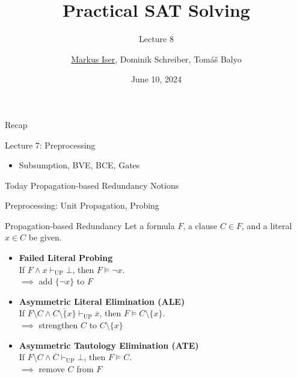 \documentclass[t]{sdqbeamer}
\title[SAT Solving]{Practical SAT Solving}
\subtitle{Lecture 8}
\author{\underline{Markus Iser}, Dominik Schreiber, Tom\'a\v{s} Balyo}
\date{June 10, 2024}
\begin{document}
\begin{frame}
	\thispagestyle{empty}
	\titlepage
\end{frame}


\begin{frame}{Recap}
    \begin{block}{Lecture 7: Preprocessing}
		\begin{itemize}\setlength{\itemsep}{1ex}
			\item Subsumption, BVE, BCE, Gates
		\end{itemize}
    \end{block}
	\begin{block}{Today}
        Propagation-based Redundancy Notions
	\end{block}
\end{frame}
    

\begin{frame}{Preprocessing: Unit Propagation, Probing}
\begin{block}{Propagation-based Redundancy}
Let a formula $F$, a clause $C \in F$, and a literal $x \in C$ be given.\\[1ex]
\begin{itemize}\setlength{\itemsep}{1ex}
    \item \textbf{Failed Literal Probing}\\[1pt]
    If $F \land x \vdash_{\mathop{UP}} \bot$, then $F \models \lnot x$.\\$\implies$ add $\{ \lnot x \}$ to $F$
    \item \textbf{Asymmetric Literal Elimination (ALE)}\\[1pt]
    If $F \setminus C \land \overline{C \setminus \{ x \}} \vdash_{\mathop{UP}} \overline x$, then $F \models C \setminus \{ x \}$.
    \\$\implies$ strengthen $C$ to $C \setminus \{ x \}$
    \item \textbf{Asymmetric Tautology Elimination (ATE)}\\[1pt]
    If $F \setminus C \land \overline C \vdash_{\mathop{UP}} \bot$, then $F \models C$.
    \\$\implies$ remove $C$ from $F$
\end{itemize}
\end{block}
\end{frame}
\end{document}
